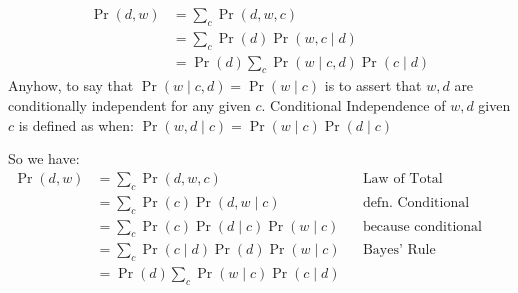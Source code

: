 \documentclass[a4paper,10.5pt]{jsarticle}  %
\begin{document}
\begin{align*} \Pr(d,w) &= \sum_{c} \Pr (d,w,c) \\ &= \sum_{c} \Pr(d) \Pr(w,c\mid d)\\ &= \Pr(d) \sum_{c} \Pr(w\mid c,d) \Pr(c\mid d) \end{align*}
Anyhow, to say that $\Pr(w\mid c,d)=\Pr(w\mid c)$ is to assert that $w,d$ are conditionally independent for any given $c$. Conditional Independence of $w,d$ given $c$ is defined as when: $\Pr(w,d\mid c)=\Pr(w\mid c)\Pr(d\mid c)$

So we have:
\begin{align*} \Pr(d,w) &= \sum_{c} \Pr (d,w,c) && \text{Law of Total Probability} \\ &= \sum_{c} \Pr(c) \Pr(d,w\mid c) && \text{defn. Conditional Probability}\\ &= \sum_{c} \Pr(c) \Pr(d\mid c) \Pr(w\mid c) && \text{because conditional independence} \\ &= \sum_c \Pr(c\mid d)\Pr(d)\Pr(w\mid c) && \text{Bayes' Rule}\\ &= \Pr(d)\sum_c \Pr(w\mid c)\Pr(c\mid d) 
\end{align*}
\end{document}
